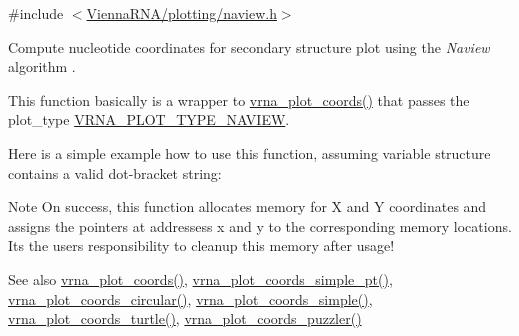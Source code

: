 {\ttfamily \#include $<$\mbox{\hyperlink{plotting_2naview_8h}{Vienna\+R\+N\+A/plotting/naview.\+h}}$>$}



Compute nucleotide coordinates for secondary structure plot using the {\itshape Naview} algorithm \cite{bruccoleri:1988}. 

This function basically is a wrapper to \mbox{\hyperlink{group__plot__layout__utils_ga2e2adbef0283a8ff2dfe5284eb1f4a6a}{vrna\+\_\+plot\+\_\+coords()}} that passes the {\ttfamily plot\+\_\+type} \mbox{\hyperlink{group__plot__layout__utils_ga94d4c863ecac2f220f76658afb92f964}{V\+R\+N\+A\+\_\+\+P\+L\+O\+T\+\_\+\+T\+Y\+P\+E\+\_\+\+N\+A\+V\+I\+EW}}.

Here is a simple example how to use this function, assuming variable {\ttfamily structure} contains a valid dot-\/bracket string\+: 
\begin{DoxyCode}{0}
\DoxyCodeLine{}
\DoxyCodeLine{\} \textcolor{keywordflow}{else} \{}
\DoxyCodeLine{\}}
\DoxyCodeLine{}
\end{DoxyCode}


\begin{DoxyNote}{Note}
On success, this function allocates memory for X and Y coordinates and assigns the pointers at addressess {\ttfamily x} and {\ttfamily y} to the corresponding memory locations. It\textquotesingle{}s the users responsibility to cleanup this memory after usage!
\end{DoxyNote}
\begin{DoxySeeAlso}{See also}
\mbox{\hyperlink{group__plot__layout__utils_ga2e2adbef0283a8ff2dfe5284eb1f4a6a}{vrna\+\_\+plot\+\_\+coords()}}, \mbox{\hyperlink{group__plot__layout__utils_ga76788091848e73cfb24b31536e22b7dd}{vrna\+\_\+plot\+\_\+coords\+\_\+simple\+\_\+pt()}}, \mbox{\hyperlink{group__plot__layout__utils_ga47ff1fd92e9658361a758fdb03122911}{vrna\+\_\+plot\+\_\+coords\+\_\+circular()}}, \mbox{\hyperlink{group__plot__layout__utils_gaea0dada4d0113d16d4890bc0937292e6}{vrna\+\_\+plot\+\_\+coords\+\_\+simple()}}, \mbox{\hyperlink{group__plot__layout__utils_ga195139110e2877b92c7f82d05b6dad19}{vrna\+\_\+plot\+\_\+coords\+\_\+turtle()}}, \mbox{\hyperlink{group__plot__layout__utils_gafd49896df8780c9669125429bc0da9b3}{vrna\+\_\+plot\+\_\+coords\+\_\+puzzler()}}
\end{DoxySeeAlso}

